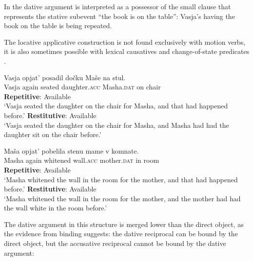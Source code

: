 \documentclass[output=paper]{langscibook}
\begin{document}
\noindent In  the dative argument is interpreted as a possessor of the small clause that represents the stative subevent “the book is on the table”: Vasja’s having the book on the table is being repeated.



The locative applicative construction is not found exclusively with motion verbs, it is also sometimes possible with lexical causatives  and change-of-state predicates .


 \ea\label{ex:bondarenko:37}
\gll Vasja opjat’ posadil dočku Maše na stul.\\
     Vasja again seated daughter.\textsc{acc} Masha.\textsc{dat} on chair\\
\ea \textbf{Repetitive}: Available\\
`Vasja seated the daughter on the chair for Masha, and that had   happened before.'
\ex \textbf{Restitutive}: Available\\
`Vasja seated the daughter on the chair for Masha, and Masha   had had the daughter sit on the chair before.'
\z\z

 \ea\label{ex:bondarenko:38}
\gll Maša opjat’ pobelila stenu mame v komnate.\\
     Masha again whitened wall.\textsc{acc} mother.\textsc{dat} in room\\
\ea \textbf{Repetitive}: Available\\
`Masha whitened the wall in the room for the mother, and that   had happened before.'
\ex \textbf{Restitutive}: Available\\
`Masha whitened the wall in the room for the mother, and the   mother had had the wall white in the room before.'
\z\z


\noindent The dative argument in this structure is merged lower than the direct object, as the evidence from binding suggests: the dative reciprocal can be bound by the direct object, but the accusative reciprocal cannot be bound by the dative argument:


 \ea\label{ex:bondarenko:39}
 \label{ex:bondarenko:40}
\z\z
\end{document}
